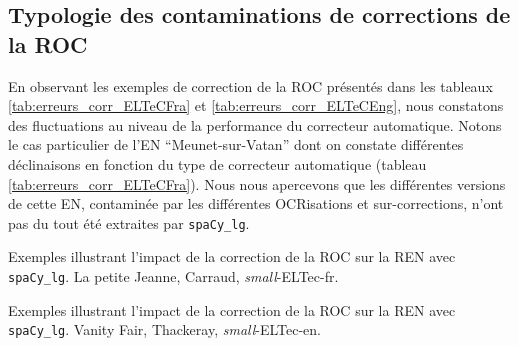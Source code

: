 \subsection{Typologie des contaminations de corrections de la ROC}
\label{subsec:Typologie_COR-OCR-IMPACT-NER}

En observant les exemples de correction de la ROC présentés dans les tableaux \ref{tab:erreurs_corr_ELTeCFra} et \ref{tab:erreurs_corr_ELTeCEng}, nous constatons des fluctuations au niveau de la performance du correcteur automatique.
Notons le cas particulier de l'EN ``Meunet-sur-Vatan'' dont on constate différentes déclinaisons en fonction du type de correcteur automatique (tableau \ref{tab:erreurs_corr_ELTeCFra}). Nous nous apercevons que les différentes versions de cette EN, contaminée par les différentes OCRisations et sur-corrections, n'ont pas du tout été extraites par \texttt{spaCy\_lg}.

\begin{table}[h!]
\scriptsize
    \centering
   
     \caption{Exemples illustrant l'impact de la correction de la ROC sur la REN avec \texttt{spaCy\_lg}. {\normalfont La petite Jeanne}, Carraud, \textit{small}-ELTec-fr.}
    \label{tab:erreurs_corr_ELTeCFra}
\end{table}

\begin{table}[h!]
\scriptsize
    \centering
   
    \caption{Exemples illustrant l'impact de la correction de la ROC sur la REN avec \texttt{spaCy\_lg}. {\normalfont Vanity Fair}, Thackeray, \textit{small}-ELTec-en.}
    \label{tab:erreurs_corr_ELTeCEng}
\end{table}

